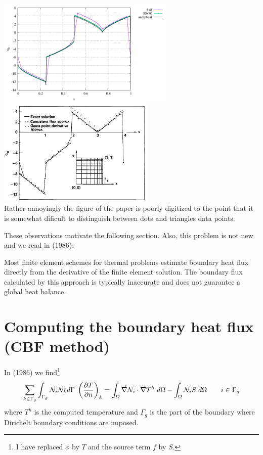 \begin{center}
\includegraphics[width=8.5cm]{python_codes/fieldstone_173/results/exp1/heat_flux_boundary.pdf}
\includegraphics[width=7.5cm]{python_codes/fieldstone_173/images/grls87a}\\
{\captionfont Rather annoyingly the figure of the paper is poorly digitized 
to the point that it is somewhat dificult to distinguish between dots and triangles data points.}
\end{center}

These observations motivate the following section.
Also, this problem is not new and we read in \textcite{mizu86} (1986):
\begin{displayquote}
{\color{MidnightBlue}
Most finite element schemes for thermal problems estimate boundary heat flux directly from the
derivative of the finite element solution. The boundary flux calculated by this approach is typically
inaccurate and does not guarantee a global heat balance.}
\end{displayquote}

\section*{Computing the boundary heat flux (CBF method)}

In \textcite{mizu86} (1986) we find\footnote{I have replaced $\phi$ by $T$ and 
the source term $f$ by $S$.}
\[
\sum_{k \in \Gamma_g} \int_{\Gamma_g} {\mathcal{N}}_i {\mathcal{N}}_k d\Gamma \; 
\left(
\frac{\partial T}{\partial n}
\right)_k
=
\int_\Omega \vec\nabla {\mathcal{N}}_i \cdot \vec\nabla T^h \; d\Omega
- \int_\Omega {\mathcal{N}}_i S \; d\Omega
\qquad
i \in \Gamma_g
\]
where $T^h$ is the computed temperature and $\Gamma_g$ is the part of the 
boundary where Dirichelt boundary conditions are imposed.

